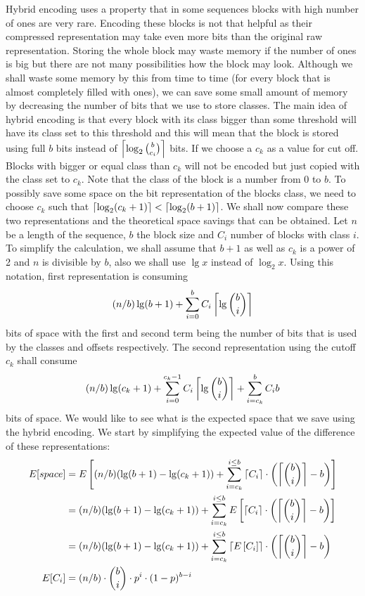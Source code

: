 Hybrid encoding uses a property that in some sequences blocks with high number
of ones are very rare. Encoding these blocks is not that helpful as their
compressed representation may take even more bits than the original raw
representation. Storing the whole block may waste memory if the number of
ones is big but there are not many possibilities how the block may look.
Although we shall waste some memory by this from time to time (for every
block that is almost completely filled with ones), we can save some small
amount of memory by decreasing the number of bits that we use to store
classes. The main idea of hybrid encoding is that every block with its
class bigger than some threshold will have its class set to this threshold
and this will mean that the block is stored using full $b$ bits instead of
$\left\lceil \log_2{b\choose c_i} \right\rceil$ bits. If we choose a $c_k$ as a value for cut off.
Blocks with bigger or equal class than $c_k$ will not be encoded but just
copied with the class set to $c_k$. Note that the class of the block
is a number from 0 to $b$. To possibly save some space on the bit representation
of the blocks class, we need to choose $c_k$ such that $\left\lceil \log_2(c_k+1) \right\rceil < \left\lceil \log_2(b+1) \right\rceil$.
We shall now compare these two representations and the theoretical space savings that
can be obtained. Let $n$ be a length of the sequence, $b$ the block size and $C_i$
number of blocks with class $i$. To simplify the calculation, we shall assume that $b+1$
as well as $c_k$ is a power of 2 and $n$ is divisible by $b$, also we shall
use $\lg x$ instead of $\log_2 x$. Using this notation, first representation is
consuming $$(n/b)\lg (b+1) + \sum_{i=0}^{b} C_i\left\lceil \lg {b\choose i} \right\rceil$$
bits of space with the first and second term being the number of bits that
is used by the classes and offsets respectively. The second representation
using the cutoff $c_k$ shall consume $$(n/b)\lg (c_k+1)+\sum_{i=0}^{c_k-1}C_i\left\lceil \lg {b\choose i} \right\rceil + \sum_{i=c_k}^{b}C_i b$$
bits of space. We would like to see what is the expected space that we save
using the hybrid encoding. We start by simplifying the expected value of the
difference of these representations:
\begin{align*}
E[space] &= E\left[(n/b)(\lg(b+1)-\lg(c_k+1)) + \sum_{i=c_k}^{i\leq b}\left\lceil C_i \right\rceil\cdot \left(\left\lceil {b\choose i} \right\rceil - b\right)\right]\\
&=(n/b)(\lg(b+1)-\lg(c_k+1)) + \sum_{i=c_k}^{i\leq b}E\left[\left\lceil C_i \right\rceil\cdot \left(\left\lceil {b\choose i} \right\rceil - b\right)\right]\\
&=(n/b)(\lg(b+1)-\lg(c_k+1)) + \sum_{i=c_k}^{i\leq b}\left\lceil E\left[C_i\right] \right\rceil\cdot \left(\left\lceil {b\choose i} \right\rceil - b\right)\\
E[C_i] &= (n/b)\cdot {b\choose i}\cdot p^i\cdot (1-p)^{b-i}
\end{align*}

